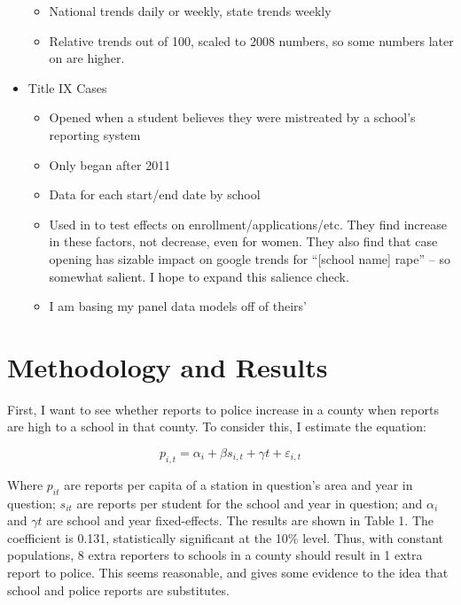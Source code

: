 \documentclass[AER]{AEA}
\begin{document}
\begin{itemize}
\begin{itemize}
        \item National trends daily or weekly, state trends weekly
        \item Relative trends out of 100, scaled to 2008 numbers, so some numbers later on are higher.
    \end{itemize}
    \item Title IX Cases
    \begin{itemize}
        \item Opened when a student believes they were mistreated by a school's reporting system
        \item Only began after 2011
        \item Data for each start/end date by school
        \item Used in  to test effects on enrollment/applications/etc. They find increase in these factors, not decrease, even for women. They also find that case opening has sizable impact on google trends for “[school name] rape” – so somewhat salient. I hope to expand this salience check.
        \item I am basing my panel data models off of theirs'
    \end{itemize}
\end{itemize}

\section{Methodology and Results}

First, I want to see whether reports to police increase in a county when reports are high to a school in that county. To consider this, I estimate the equation: 

$$ 
p_{i,t} = \alpha_{i} + \beta s_{i,t} + \gamma{t} + \varepsilon_{i,t}
$$ 

Where $p_{it}$ are reports per capita of a station in question's area and year in question; $s_{it}$ are reports per student for the school and year in question; and $\alpha_{i}$ and $\gamma{t}$ are school and year fixed-effects. The results are shown in Table 1. The coefficient is 0.131, statistically significant at the 10\% level. Thus, with constant populations, 8 extra reporters to schools in a county should result in 1 extra report to police.  This seems reasonable, and gives some evidence to the idea that school and police reports are substitutes. 
\end{document}
